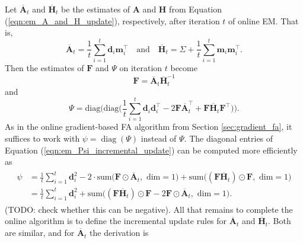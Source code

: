 \documentclass[msc,deptreport.inf]{infthesis} %
\newcommand{\matr}[1]{\mathbf{#1}}
\newcommand{\diag}{\mathop{\mathrm{diag}}}
\begin{document}
Let $\overline{\matr{A}}_t$ and $\overline{\matr{H}}_t$ be the estimates of $\matr{A}$ and $\matr{H}$ from Equation (\ref{eqn:em_A_and_H_update}), respectively, after iteration $t$ of online EM. That is,
\begin{equation}\label{eqn:em_A_and_H_incremental_update}
	\overline{\matr{A}}_t = \frac{1}{t} \sum_{i=1}^t \matr{d}_i \matr{m}_i^\intercal \quad \text{and} \quad 
	\overline{\matr{H}}_t = \Sigma + \frac{1}{t} \sum_{i=1}^t \matr{m}_i \matr{m}_i^\intercal.
\end{equation}
Then the estimates of $\matr{F}$ and $\Psi$ on iteration $t$ become
\begin{equation}
	\matr{F} = \overline{\matr{A}}_t \overline{\matr{H}}_t^{-1}
\end{equation}
and
\begin{equation}\label{eqn:em_Psi_incremental_update}
	\Psi = \text{diag}\Bigg(\text{diag}\Bigg( \frac{1}{t} \sum_{i=1}^t \matr{d}_i \matr{d}_i^\intercal - 2 \matr{F}\overline{\matr{A}}_t^\intercal + \matr{F}\overline{\matr{H}}_t \matr{F}^\intercal \Bigg)\Bigg).
\end{equation}
As in the online gradient-based FA algorithm from Section \ref{sec:gradient_fa}, it suffices to work with $\psi = \diag(\Psi)$ instead of $\Psi$. 
The diagonal entries of Equation (\ref{eqn:em_Psi_incremental_update}) can be computed more efficiently as 
\begin{align}
\begin{split}\label{eqn:em_Psi_efficient_update}
	\psi 
	& = \frac{1}{t} \sum_{i=1}^t \matr{d}_i^2 
	- 2 \cdot \text{sum} \big(\matr{F} \odot \overline{\matr{A}}_t, \text{ dim} = 1\big)
	+ \text{sum}\big((\matr{F} \overline{\matr{H}}_t) \odot \matr{F}, \text{ dim} = 1\big) \\	
	& = \frac{1}{t} \sum_{i=1}^t \matr{d}_i^2 
	+ \text{sum} \big((\matr{F} \overline{\matr{H}}_t) \odot \matr{F} -2\matr{F} \odot \overline{\matr{A}}_t , \text{ dim} = 1\big).
\end{split}
\end{align}
(TODO: check whether this can be negative).
All that remains to complete the online algorithm is to define the incremental update rules for $\overline{\matr{A}}_t$ and $\overline{\matr{H}}_t$. Both are similar, and for $\overline{\matr{A}}_t$ the derivation is 
\end{document}
